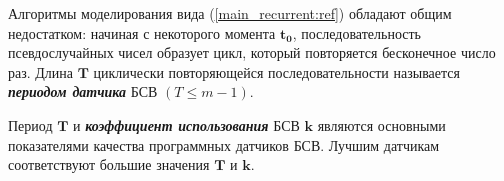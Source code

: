 Алгоритмы моделирования вида (\ref{main_recurrent:ref}) обладают общим недостатком: начиная с некоторого момента $\mathbf{t_{0}}$, последовательность псевдослучайных чисел образует цикл, который повторяется бесконечное число раз. Длина $\mathbf{T}$ циклически повторяющейся последовательности называется \textbf{\textit{периодом датчика}} БСВ $(T \leq m - 1)$.

Период $\mathbf{T}$ и \textbf{\textit{коэффициент использования}} БСВ $\mathbf{k}$ являются основными показателями качества программных датчиков БСВ. Лучшим датчикам соответствуют большие значения $\mathbf{T}$ и $\mathbf{k}$.
